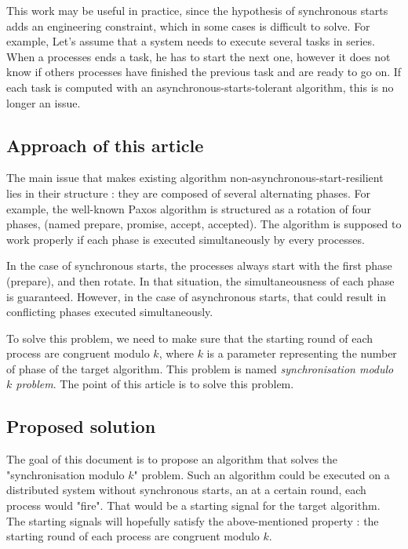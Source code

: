 \documentclass{article}
\begin{document}
This work may be useful in practice, since the hypothesis of synchronous starts adds an engineering constraint, which in some cases is difficult to solve.
For example, Let's assume that a system needs to execute several tasks in series.
When a processes ends a task, he has to start the next one, however it does not know if others processes have finished the previous task and are ready to go on.
If each task is computed with an asynchronous-starts-tolerant algorithm, this is no longer an issue.

\subsection{Approach of this article}

The main issue that makes existing algorithm non-asynchronous-start-resilient lies in their structure :
they are composed of several alternating phases.
For example, the well-known Paxos algorithm is structured as a rotation of four phases, (named prepare,
promise, accept, accepted).
The algorithm is supposed to work properly if each phase is executed simultaneously by every processes.

In the case of synchronous starts, the processes always start with the first phase (prepare), and then rotate.
In that situation, the simultaneousness of each phase is guaranteed.
However, in the case of asynchronous starts, that could result in conflicting phases executed simultaneously.

To solve this problem, we need to make sure that the starting round of each process are congruent modulo $k$,
where $k$ is a parameter representing the number of phase of the target algorithm.
This problem is named \emph{synchronisation modulo $k$ problem}.
The point of this article is to solve this problem.

\subsection{Proposed solution}

The goal of this document is to propose an algorithm that solves the "synchronisation modulo $k$" problem.
Such an algorithm could be executed on a distributed system without synchronous starts,
an at a certain round, each process would "fire".
That would be a starting signal for the target algorithm.
The starting signals will hopefully satisfy the above-mentioned property :
the starting round of each process are congruent modulo $k$.
\end{document}
